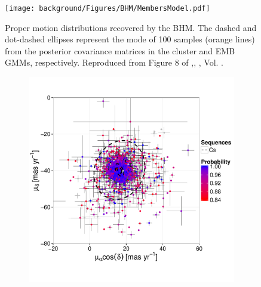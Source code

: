 \begin{figure}[ht!]
\begin{center}
\texttt{[image: background/Figures/BHM/MembersModel.pdf]}
\caption{Proper motion distributions recovered by the BHM. The dashed and dot-dashed ellipses represent the mode of 100 samples (orange lines) from the posterior covariance matrices in the cluster and EMB GMMs, respectively. Reproduced from Figure 8 of \citet{Olivares2017},\textit{}, , Vol. .}
\label{fig:PM}
\end{center}
\end{figure}

\begin{figure}[ht!]
    \centering
    \begin{subfigure}[t]{0.45\textwidth}
    \centering
       \includegraphics[page=2,width=\textwidth]{background/Figures/BHM/Cs_members.pdf}
        \caption{}
    \end{subfigure}
    \begin{subfigure}[t]{0.45\textwidth}
    \centering

\end{subfigure}
\end{figure}
